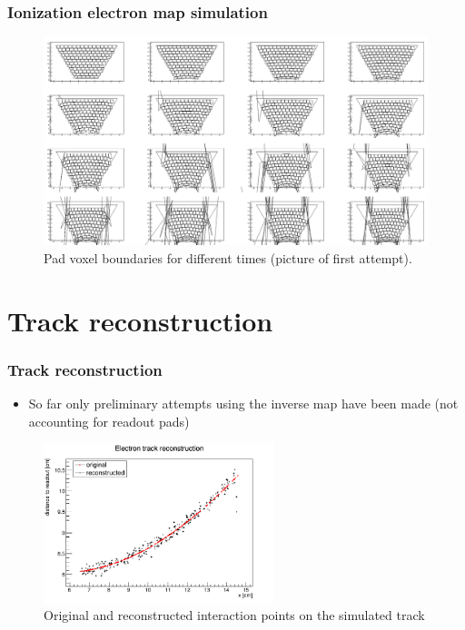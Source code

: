 \documentclass{beamer}
\begin{document}
	\begin{frame}
		\frametitle{Ionization electron map simulation}
		\begin{figure}
			\centering
			\includegraphics[height=0.68\textheight]{images/pads_dist.png}
			\caption{Pad voxel boundaries for different times (picture of first attempt).}
		\end{figure}
	\end{frame}


	\section{Track reconstruction}
	\begin{frame}
		\frametitle{Track reconstruction}
		\begin{itemize}
			\item So far only preliminary attempts using the inverse map have been made (not accounting for readout pads)
		\end{itemize}
		\begin{figure}
			\centering
			\includegraphics[width=0.6\textwidth]{images/reco_track.png}
			\caption{Original and reconstructed interaction points on the simulated track}
		\end{figure}
	\end{frame}
\end{document}
